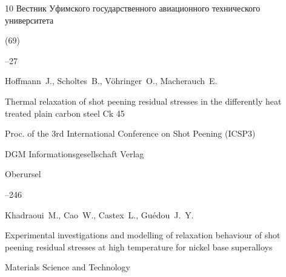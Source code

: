 \begin{thebibliography}{10}
\jour Вестник Уфимского государственного авиационного технического университета



 (69)

--27















\by Hoffmann~J., Scholtes~B., V\"ohringer~O., Macherauch~E.

\paper Thermal relaxation of shot peening residual stresses in the differently heat treated plain carbon steel Ck 45

\inbook Proc. of the 3rd International Conference on Shot Peening (ICSP3) 


\publ DGM Informationsgesellschaft Verlag

\publaddr Oberursel

--246







\by Khadraoui~M., Cao~W., Castex~L.,  Gu\'edou~J.~Y.

\paper Experimental investigations and modelling of relaxation behaviour of shot peening residual stresses at high temperature for nickel base superalloys

\jour Materials Science and Technology





\end{thebibliography}
